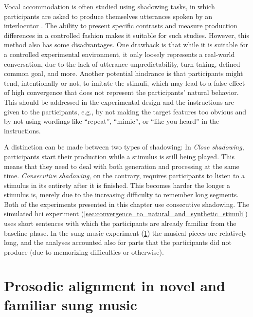 Vocal accommodation is often studied using shadowing tasks, in which participants are asked to produce themselves utterances spoken by an interlocutor \citep[e.g.,][]{Pardo2018comparison, Babel2014novelty, Shockley2004imitation, Walker2015repeat, Dias2016visibilivty, Dias2016visibilivty}.
The ability to present specific contrasts and measure production differences in a controlled fashion makes it suitable for such studies.
However, this method also has some disadvantages.
One drawback is that while it is suitable for a controlled experimental environment, it only loosely represents a real-world conversation, due to the lack of utterance unpredictability, turn-taking, defined common goal, and more.
Another potential hindrance is that participants might tend, intentionally or not, to imitate the stimuli, which may lead to a false effect of high convergence that does not represent the participants' natural behavior.
This should be addressed in the experimental design and the instructions are given to the participants, e.g., by not making the target features too obvious and by not using wordings like \enquote{repeat}, \enquote{mimic}, or \enquote{like you heard} in the instructions.

A distinction can be made between two types of shadowing:
In \emph{Close shadowing}, participants start their production while a stimulus is still being played.
This means that they need to deal with both generation and processing at the same time.
\emph{Consecutive shadowing}, on the contrary, requires participants to listen to a stimulus in its entirety after it is finished.
This becomes harder the longer a stimulus is, merely due to the increasing difficulty to remember long segments.
Both of the experiments presented in this chapter use consecutive shadowing.
The simulated \ac{hci} experiment (\cref{sec:convergence_to_natural_and_synthetic_stimuli}) uses short sentences with which the participants are already familiar from the baseline phase.
In the sung music experiment (\cref{sec:alignment_in_novel_and_familiar_sung_music}) the musical pieces are relatively long, and the analyses accounted also for parts that the participants did not produce (due to memorizing difficulties or otherwise).

\section{Prosodic alignment in novel and familiar sung music}
\label{sec:alignment_in_novel_and_familiar_sung_music}

